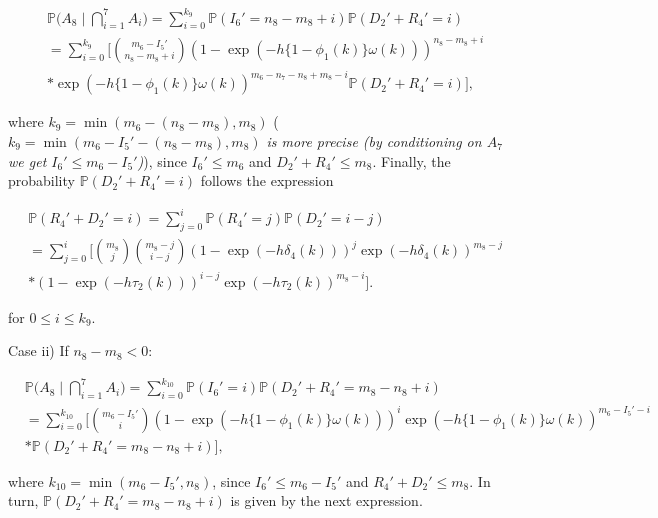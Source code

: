 \documentclass[a4paper]{article}
\theoremstyle{remark}
\begin{document}
\begin{equation*}
\begin{split}
&\mathbb{P}\bigg(A_{8}\mid \bigcap_{i=1}^{7}A_{i}\bigg)=\sum_{i=0}^{k_9} \mathbb{P}(I_{6}'=n_8-m_8+i)\mathbb{P}(D_{2}'+R_{4}'=i)\\
&=\sum_{i=0}^{k_9} \Bigg[{m_6-I_{5}' \choose n_8-m_8+i}(1-\exp(-h\{1-\phi_1(k)\}\omega(k)))^{n_8-m_8+i}\\
&*\exp(-h\{1-\phi_1(k)\}\omega(k))^{m_6-n_7-n_8+m_8-i}\mathbb{P}(D_{2}'+R_{4}'=i)\Bigg],
\end{split}
\end{equation*}

where $k_9=\min(m_6-(n_8-m_8),m_8)$  (\textit{$k_9=\min(m_6-I_{5}'-(n_8-m_8),m_8)$ is more precise (by conditioning on $A_7$ we get $I_{6}'\leq m_6-I_{5}'$)}), since $I_{6}'\leq m_6$ and $D_{2}'+R_{4}'\leq m_8$. Finally, the probability $\mathbb{P}(D_{2}'+R_{4}'=i)$ follows the expression

\begin{equation*}
\begin{split}
&\mathbb{P}(R_{4}'+D_{2}'=i)=\sum_{j=0}^{i} \mathbb{P}(R_{4}'=j)\mathbb{P}(D_{2}'=i-j)\\
&=\sum_{j=0}^{i}\Bigg[{m_8 \choose j}{m_8-j \choose i-j}(1-\exp(-h\delta_4(k)))^{j}\exp(-h\delta_4(k))^{m_8-j}\\
&*(1-\exp(-h\tau_2(k)))^{i-j}\exp(-h\tau_2(k))^{m_8-i}\Bigg].
\end{split}
\end{equation*}


for $0\leq i\leq k_9$. 

\medskip
Case ii) If $n_8-m_8< 0$:

\begin{equation*}
\begin{split}
&\mathbb{P}\bigg(A_{8}\mid \bigcap_{i=1}^{7}A_{i}\bigg)=\sum_{i=0}^{k_{10}} \mathbb{P}(I_{6}'=i)\mathbb{P}(D_{2}'+R_{4}'=m_8-n_8+i)\\
&=\sum_{i=0}^{k_{10}} \Bigg[{m_6-I_{5}' \choose i}(1-\exp(-h\{1-\phi_1(k)\}\omega(k)))^{i}\exp(-h\{1-\phi_1(k)\}\omega(k))^{m_6-I_{5}'-i}\\
&*\mathbb{P}(D_{2}'+R_{4}'=m_8-n_8+i)\Bigg],
\end{split}
\end{equation*}

where $k_{10}=\min(m_6-I_{5}',n_8)$, since $I_{6}'\leq m_6-I_{5}'$ and $R_{4}'+D_{2}'\leq m_8$. In turn, $\mathbb{P}(D_{2}'+R_{4}'=m_8-n_8+i)$ is given by the next expression.
\end{document}
